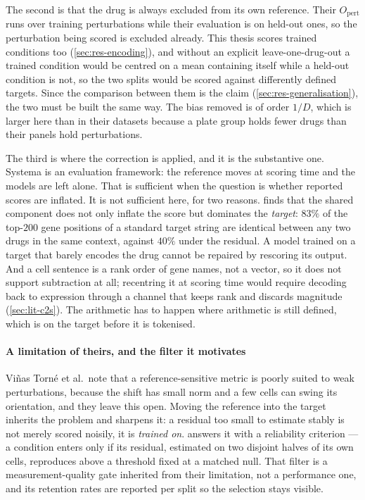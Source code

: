 The second is that the drug is always excluded from its own reference. Their
$O_{\textrm{pert}}$ runs over training perturbations while their evaluation is on
held-out ones, so the perturbation being scored is excluded already. This thesis
scores trained conditions too (\cref{sec:res-encoding}), and without an explicit
leave-one-drug-out a trained condition would be centred on a mean containing
itself while a held-out condition is not, so the two splits would be scored
against differently defined targets. Since the comparison between them is the
claim (\cref{sec:res-generalisation}), the two must be built the same way. The
bias removed is of order $1/D$, which is larger here than in their datasets
because a plate group holds fewer drugs than their panels hold perturbations.

The third is where the correction is applied, and it is the substantive one.
Systema is an evaluation framework: the reference moves at scoring time and the
models are left alone. That is sufficient when the question is whether reported
scores are inflated. It is not sufficient here, for two reasons.
 finds that the shared component does not only inflate
the score but dominates the \emph{target}: $83\%$ of the top-$200$ gene positions of a standard target string are identical between any two drugs in the same context,
against $40\%$ under the residual. A model trained on a target that barely
encodes the drug cannot be repaired by rescoring its output. And a cell sentence
is a rank order of gene names, not a vector, so it does not support subtraction
at all; recentring it at scoring time would require decoding back to expression
through a channel that keeps rank and discards magnitude
(\cref{sec:lit-c2s}). The arithmetic has to happen where arithmetic is
still defined, which is on the target before it is tokenised. 

\paragraph{A limitation of theirs, and the filter it motivates} Vi\~nas Torn\'e
et al.\ note that a reference-sensitive metric is poorly suited to weak
perturbations, because the shift has small norm and a few cells can swing its
orientation, and they leave this open. Moving the reference into the target
inherits the problem and sharpens it: a residual too small to estimate stably is
not merely scored noisily, it is \emph{trained on}. 
answers it with a reliability criterion --- a condition enters only if its
residual, estimated on two disjoint halves of its own cells, reproduces above a
threshold fixed at a matched null. That filter is a measurement-quality gate
inherited from their limitation, not a performance one, and its retention rates
are reported per split so the selection stays visible.

